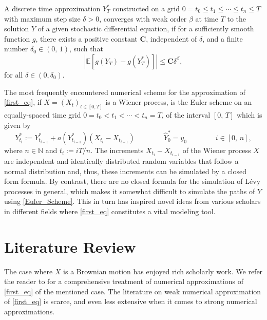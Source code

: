 \begin{definition}\label{Def_WeakE}
A discrete time approximation $Y^*_{{T}}$ constructed on a grid $0 = t_0 \leq t_1 \leq \cdots \leq t_n \leq T $ with maximum step size $\delta >0$, converges with weak order $\beta$ at time $T$ to the solution $Y$ of a given stochastic differential equation, if for a sufficiently smooth function $g$, there exists a positive constant $\mathbf{C}$, independent of $\delta$, and a finite number $\delta_0 \in (0, \, 1)$, such that 
\begin{equation}
    |\mathbb{E}[g(Y_T) - g(Y^*_{{T}})]| \leq \mathbf{C}\delta^{\beta},
\end{equation}
for all $\delta \in (0, \delta_0)$.
\end{definition}
The most frequently encountered numerical scheme for the approximation of \eqref{first_eq}, if $X=(X_t)_{t\in [0,T]}$ is a Wiener process, is the Euler scheme on an equally-spaced time grid $0 = t_0 < t_1 < \cdots < t_n = T$, of the interval $[0, \, T]$ which is given by
\begin{equation}\label{Euler_Scheme}
Y^*_{t_{i}} := Y^*_{t_{i-1}} + a(Y^*_{t_{i-1}})(X_{t_{i}} - X_{t_{i-1}})  \qquad \qquad
  \hat{Y}^*_0 = y_0 \qquad \qquad  i \in [0, \, n],
\end{equation}
where $n\in \mathbb{N}$ and $t_i := iT/n$. The increments $X_{t_{i}} - X_{t_{i-1}}$ of the Wiener process $X$ are independent and identically distributed random variables that follow a normal distribution and, thus, these increments can be simulated by a closed form formula. By contrast, there are no closed formula for the simulation of L\'evy processes in general, which makes it somewhat difficult to simulate the paths of  $Y$ using  \eqref{Euler_Scheme}. This in turn has inspired novel ideas from various scholars in different fields where \eqref{first_eq} constitutes a vital modeling tool. 

\section{Literature Review}
The case where $X$ is a Brownian motion has enjoyed rich scholarly work. We refer the reader to  for a comprehensive treatment of numerical approximations of \eqref{first_eq} of the mentioned case. The literature on weak numerical approximation of \eqref{first_eq} is scarce, and even less extensive when it comes to strong numerical approximations.

